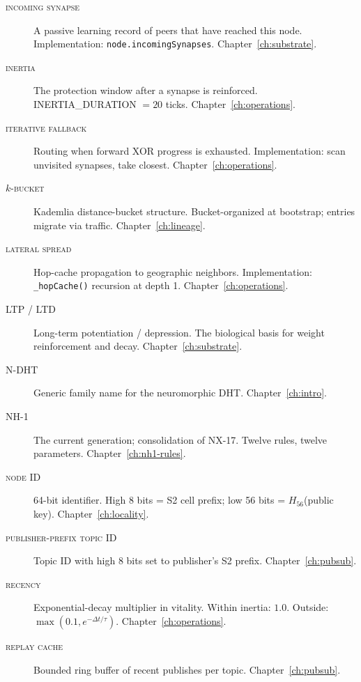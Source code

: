 \documentclass[twoside,nobib]{tufte-book}
\begin{document}
\begin{description}
\item[\textsc{incoming synapse}] A passive learning record of
peers that have reached this node. Implementation:
\texttt{node.incomingSynapses}. Chapter~\ref{ch:substrate}.

\item[\textsc{inertia}] The protection window after a synapse is
reinforced. \textsc{INERTIA\_DURATION} $= 20$ ticks.
Chapter~\ref{ch:operations}.

\item[\textsc{iterative fallback}] Routing when forward XOR
progress is exhausted. Implementation: scan unvisited synapses,
take closest. Chapter~\ref{ch:operations}.

\item[\textsc{$k$-bucket}] Kademlia distance-bucket structure.
Bucket-organized at bootstrap; entries migrate via traffic.
Chapter~\ref{ch:lineage}.

\item[\textsc{lateral spread}] Hop-cache propagation to
geographic neighbors. Implementation:
\texttt{\_hopCache()} recursion at depth 1.
Chapter~\ref{ch:operations}.

\item[\textsc{LTP / LTD}] Long-term potentiation /
depression. The biological basis for weight reinforcement and
decay. Chapter~\ref{ch:substrate}.

\item[\textsc{N-DHT}] Generic family name for the neuromorphic
DHT. Chapter~\ref{ch:intro}.

\item[\textsc{NH-1}] The current generation; consolidation of
NX-17. Twelve rules, twelve parameters. Chapter~\ref{ch:nh1-rules}.

\item[\textsc{node ID}] 64-bit identifier. High 8 bits = S2
cell prefix; low 56 bits = $H_{56}$(public key).
Chapter~\ref{ch:locality}.

\item[\textsc{publisher-prefix topic ID}] Topic ID with high 8
bits set to publisher's S2 prefix.
Chapter~\ref{ch:pubsub}.

\item[\textsc{recency}] Exponential-decay multiplier in
vitality. Within inertia: $1.0$. Outside: $\max(0.1,
e^{-\Delta t / \tau})$. Chapter~\ref{ch:operations}.

\item[\textsc{replay cache}] Bounded ring buffer of recent
publishes per topic. Chapter~\ref{ch:pubsub}.


\end{description}
\end{document}
